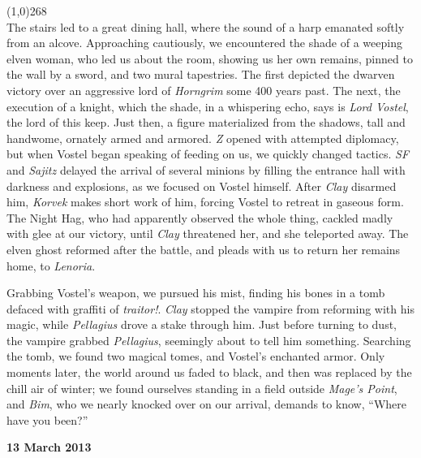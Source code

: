 \documentclass[letterpaper]{article}
\newcommand{\colline}{\noindent\line(1,0){268} \\}
\newcommand{\e}[1]{\emph{#1}}
\newcommand{\B}[1]{\textbf{#1}}
\newenvironment{notesection}[1]
{\noindent {\huge \B{#1}} \par
\vspace{-0.75em}
\colline
\begingroup\fontsize{9pt}{12pt}\selectfont}
{\endgroup}
\begin{document}
\begin{notesection}{Events}
The stairs led to a great dining hall, where the sound of a harp emanated softly from an alcove.  Approaching cautiously, we encountered the shade of a weeping elven woman, who led us about the room, showing us her own remains, pinned to the wall by a sword, and two mural tapestries.  The first depicted the dwarven victory over an aggressive lord of \e{Horngrim} some 400 years past.  The next, the execution of a knight, which the shade, in a whispering echo, says is \e{Lord Vostel}, the lord of this keep.  Just then, a figure materialized from the shadows, tall and handwome, ornately armed and armored.  \e{Z} opened with attempted diplomacy, but when Vostel began speaking of feeding on us, we quickly changed tactics.  \e{SF} and \e{Sajitz} delayed the arrival of several minions by filling the entrance hall with darkness and explosions, as we focused on Vostel himself.  After \e{Clay} disarmed him, \e{Korvek} makes short work of him, forcing Vostel to retreat in gaseous form. The Night Hag, who had apparently observed the whole thing, cackled madly with glee at our victory, until \e{Clay} threatened her, and she teleported away. The elven ghost reformed after the battle, and pleads with us to return her remains home, to \e{Lenoria}.

Grabbing Vostel's weapon, we pursued his mist, finding his bones in a tomb defaced with graffiti of \e{traitor!}.  \e{Clay} stopped the vampire from reforming with his magic, while \e{Pellagius} drove a stake through him.  Just before turning to dust, the vampire grabbed \e{Pellagius}, seemingly about to tell him something.  Searching the tomb, we found two magical tomes, and Vostel's enchanted armor. Only moments later, the world around us faded to black, and then was replaced by the chill air of winter; we found ourselves standing in a field outside \e{Mage's Point}, and \e{Bim}, who we nearly knocked over on our arrival, demands to know, ``Where have you been?''

\B{13 March 2013}

\end{notesection}
\end{document}
